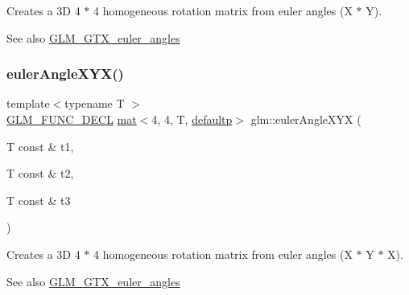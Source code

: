 Creates a 3D 4 $\ast$ 4 homogeneous rotation matrix from euler angles (X $\ast$ Y). \begin{DoxySeeAlso}{See also}
\mbox{\hyperlink{group__gtx__euler__angles}{G\+L\+M\+\_\+\+G\+T\+X\+\_\+euler\+\_\+angles}} 
\end{DoxySeeAlso}
\mbox{\label{group__gtx__euler__angles_ga29bd0787a28a6648159c0d6e69706066}} 
\subsubsection{\texorpdfstring{euler\+Angle\+X\+Y\+X()}{eulerAngleXYX()}}
{\footnotesize\ttfamily template$<$typename T $>$ \\
\mbox{\hyperlink{setup_8hpp_ab2d052de21a70539923e9bcbf6e83a51}{G\+L\+M\+\_\+\+F\+U\+N\+C\+\_\+\+D\+E\+CL}} \mbox{\hyperlink{structglm_1_1mat}{mat}}$<$4, 4, T, \mbox{\hyperlink{namespaceglm_a36ed105b07c7746804d7fdc7cc90ff25a9d21ccd8b5a009ec7eb7677befc3bf51}{defaultp}}$>$ glm\+::euler\+Angle\+X\+YX (\begin{DoxyParamCaption}\item[{T const \&}]{t1,  }\item[{T const \&}]{t2,  }\item[{T const \&}]{t3 }\end{DoxyParamCaption})}

Creates a 3D 4 $\ast$ 4 homogeneous rotation matrix from euler angles (X $\ast$ Y $\ast$ X). \begin{DoxySeeAlso}{See also}
\mbox{\hyperlink{group__gtx__euler__angles}{G\+L\+M\+\_\+\+G\+T\+X\+\_\+euler\+\_\+angles}} 
\end{DoxySeeAlso}
\mbox{\label{group__gtx__euler__angles_ga1975e0f0e9bed7f716dc9946da2ab645}} 
